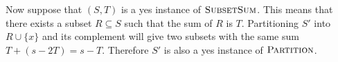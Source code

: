 \documentclass{article}
\begin{document}
\begin{solution}
\begin{enumerate}[label = (\alph*)]
    Now suppose that $(S, T)$ is a yes instance of $\mathsf{\textsc{SubsetSum}}$.
    This means that there exists a subset $R\subseteq S$ such that the sum of $R$ is $T$.
    Partitioning $S'$ into $R\cup \{x\}$ and its complement will give two subsets with the same sum $T+(s-2T)=s-T$.
    Therefore $S'$ is also a yes instance of $\mathsf{\textsc{Partition}}$.





\end{enumerate}
\end{solution}
\end{document}
